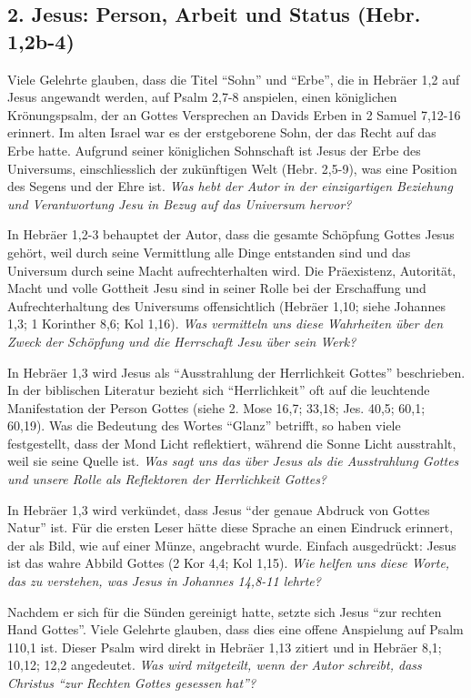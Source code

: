\documentclass[]{krantz}
\begin{document}
\subsection{2. Jesus: Person, Arbeit und Status (Hebr.
1,2b-4)}\label{jesus-person-arbeit-und-status-hebr.-12b-4}

Viele Gelehrte glauben, dass die Titel ``Sohn'' und ``Erbe'', die in
Hebräer 1,2 auf Jesus angewandt werden, auf Psalm 2,7-8 anspielen, einen
königlichen Krönungspsalm, der an Gottes Versprechen an Davids Erben in
2 Samuel 7,12-16 erinnert. Im alten Israel war es der erstgeborene Sohn,
der das Recht auf das Erbe hatte. Aufgrund seiner königlichen Sohnschaft
ist Jesus der Erbe des Universums, einschliesslich der zukünftigen Welt
(Hebr. 2,5-9), was eine Position des Segens und der Ehre ist. \emph{Was
hebt der Autor in der einzigartigen Beziehung und Verantwortung Jesu in
Bezug auf das Universum hervor?}

In Hebräer 1,2-3 behauptet der Autor, dass die gesamte Schöpfung Gottes
Jesus gehört, weil durch seine Vermittlung alle Dinge entstanden sind
und das Universum durch seine Macht aufrechterhalten wird. Die
Präexistenz, Autorität, Macht und volle Gottheit Jesu sind in seiner
Rolle bei der Erschaffung und Aufrechterhaltung des Universums
offensichtlich (Hebräer 1,10; siehe Johannes 1,3; 1 Korinther 8,6; Kol
1,16). \emph{Was vermitteln uns diese Wahrheiten über den Zweck der
Schöpfung und die Herrschaft Jesu über sein Werk?}

In Hebräer 1,3 wird Jesus als ``Ausstrahlung der Herrlichkeit Gottes''
beschrieben. In der biblischen Literatur bezieht sich ``Herrlichkeit''
oft auf die leuchtende Manifestation der Person Gottes (siehe 2. Mose
16,7; 33,18; Jes. 40,5; 60,1; 60,19). Was die Bedeutung des Wortes
``Glanz'' betrifft, so haben viele festgestellt, dass der Mond Licht
reflektiert, während die Sonne Licht ausstrahlt, weil sie seine Quelle
ist. \emph{Was sagt uns das über Jesus als die Ausstrahlung Gottes und
unsere Rolle als Reflektoren der Herrlichkeit Gottes?}

In Hebräer 1,3 wird verkündet, dass Jesus ``der genaue Abdruck von
Gottes Natur'' ist. Für die ersten Leser hätte diese Sprache an einen
Eindruck erinnert, der als Bild, wie auf einer Münze, angebracht wurde.
Einfach ausgedrückt: Jesus ist das wahre Abbild Gottes (2 Kor 4,4; Kol
1,15). \emph{Wie helfen uns diese Worte, das zu verstehen, was Jesus in
Johannes 14,8-11 lehrte?}

Nachdem er sich für die Sünden gereinigt hatte, setzte sich Jesus ``zur
rechten Hand Gottes''. Viele Gelehrte glauben, dass dies eine offene
Anspielung auf Psalm 110,1 ist. Dieser Psalm wird direkt in Hebräer 1,13
zitiert und in Hebräer 8,1; 10,12; 12,2 angedeutet. \emph{Was wird
mitgeteilt, wenn der Autor schreibt, dass Christus ``zur Rechten Gottes
gesessen hat''?}
\end{document}
